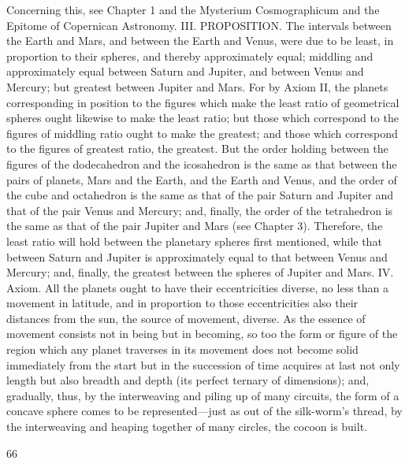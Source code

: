 \documentclass{article}
\begin{document}
Concerning this, see Chapter 1 and the Mysterium Cosmographicum and
the Epitome of Copernican Astronomy.
III. PROPOSITION. The intervals between the Earth and Mars, and
between the Earth and Venus, were due to be least, in proportion to their
spheres, and thereby approximately equal; middling and approximately
equal between Saturn and Jupiter, and between Venus and Mercury; but
greatest between Jupiter and Mars.
For by Axiom II, the planets corresponding in position to the figures
which make the least ratio of geometrical spheres ought likewise to make
the least ratio; but those which correspond to the figures of middling
ratio ought to make the greatest; and those which correspond to the
figures of greatest ratio, the greatest. But the order holding between the
figures of the dodecahedron and the icosahedron is the same as that
between the pairs of planets, Mars and the Earth, and the Earth and
Venus, and the order of the cube and octahedron is the same as that of
the pair Saturn and Jupiter and that of the pair Venus and Mercury; and,
finally, the order of the tetrahedron is the same as that of the pair Jupiter
and Mars (see Chapter 3). Therefore, the least ratio will hold between the
planetary spheres first mentioned, while that between Saturn and
Jupiter is approximately equal to that between Venus and Mercury; and,
finally, the greatest between the spheres of Jupiter and Mars.
IV. Axiom. All the planets ought to have their eccentricities diverse, no
less than a movement in latitude, and in proportion to those
eccentricities also their distances from the sun, the source of movement,
diverse.
As the essence of movement consists not in being but in becoming, so
too the form or figure of the region which any planet traverses in its
movement does not become solid immediately from the start but in the
succession of time acquires at last not only length but also breadth and
depth (its perfect ternary of dimensions); and, gradually, thus, by the
interweaving and piling up of many circuits, the form of a concave
sphere comes to be represented—just as out of the silk-worm's thread, by
the interweaving and heaping together of many circles, the cocoon is
built.


66
\end{document}
